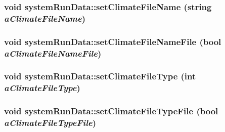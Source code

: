 \label{classsystem_run_data_ae47063135ee24308da4bed987c61346b}
\hypertarget{classsystem_run_data_af47cd03f00b0ae29a8f5b83eee8ba440}{
\subsubsection[{setClimateFileName}]{\setlength{\rightskip}{0pt plus 5cm}void systemRunData::setClimateFileName (string {\em aClimateFileName})}}
\label{classsystem_run_data_af47cd03f00b0ae29a8f5b83eee8ba440}
\hypertarget{classsystem_run_data_a31fba0065583f2879c0821258e724546}{
\subsubsection[{setClimateFileNameFile}]{\setlength{\rightskip}{0pt plus 5cm}void systemRunData::setClimateFileNameFile (bool {\em aClimateFileNameFile})}}
\label{classsystem_run_data_a31fba0065583f2879c0821258e724546}
\hypertarget{classsystem_run_data_a31f6dae83f836b96ecf4dd6c92ef1880}{
\subsubsection[{setClimateFileType}]{\setlength{\rightskip}{0pt plus 5cm}void systemRunData::setClimateFileType (int {\em aClimateFileType})}}
\label{classsystem_run_data_a31f6dae83f836b96ecf4dd6c92ef1880}
\hypertarget{classsystem_run_data_aa433850561e78296dbb6db231c1d5318}{
\subsubsection[{setClimateFileTypeFile}]{\setlength{\rightskip}{0pt plus 5cm}void systemRunData::setClimateFileTypeFile (bool {\em aClimateFileTypeFile})}}

